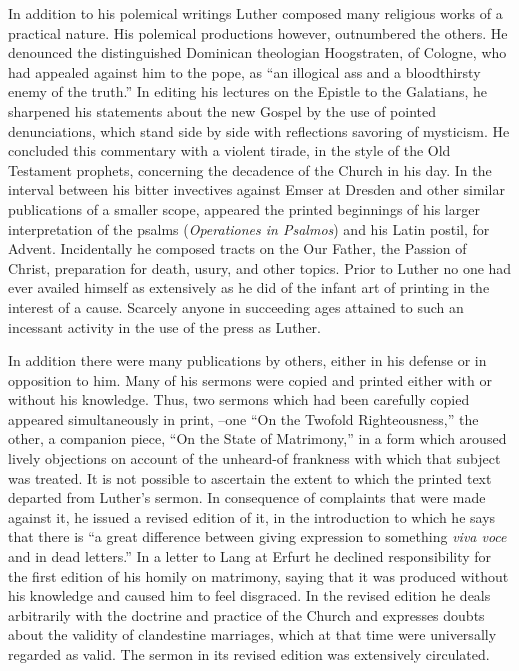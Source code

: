 In addition to his polemical writings Luther composed many religious
works of a practical nature. His polemical productions however, outnumbered
the others. He denounced the distinguished Dominican
theologian Hoogstraten, of Cologne, who had appealed
against him to the pope, as “an illogical ass and a bloodthirsty enemy
of the truth.” In editing his lectures on the Epistle to the Galatians,
he sharpened his statements about the new Gospel by the use
of pointed denunciations, which stand side by side with reflections savoring
of mysticism. He concluded this commentary with a violent tirade,
in the style of the Old Testament prophets, concerning the decadence
of the Church in his day. In the interval between his bitter invectives
against Emser at Dresden and other similar publications of a smaller
scope, appeared the printed beginnings of his larger interpretation
of the psalms (\textit{Operationes in Psalmos}) and his Latin postil, for
Advent. Incidentally he composed tracts on the Our Father, the
Passion of Christ, preparation for death, usury, and other topics.
Prior to Luther no one had ever availed himself as extensively as he
did of the infant art of printing in the interest of a cause. Scarcely
anyone in succeeding ages attained to such an incessant activity in
the use of the press as Luther.

In addition there were many publications by others, either in
his defense or in opposition to him. Many of his sermons were copied
and printed either with or without his knowledge. Thus, two sermons
which had been carefully copied appeared simultaneously in print,
--one “On the Twofold Righteousness,” the other, a companion
piece, “On the State of Matrimony,” in a form which aroused lively
objections on account of the unheard-of frankness with which
that subject was treated. It is not possible to ascertain the extent to
which the printed text departed from Luther’s sermon. In consequence of
complaints that were made against it, he issued a revised
edition of it, in the introduction to which he says that there is “a
great difference between giving expression to something \textit{viva voce}
and in dead letters.” In a letter to Lang at Erfurt he declined responsibility
for the first edition of his homily on matrimony, saying that
it was produced without his knowledge and caused him to feel disgraced.
In the revised edition he deals arbitrarily with the doctrine
and practice of the Church and expresses doubts about the validity
of clandestine marriages, which at that time were universally regarded
as valid. The sermon in its revised edition was extensively
circulated.

